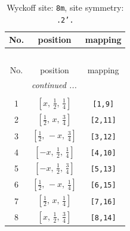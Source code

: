 \documentclass[fleqn,8pt]{jsarticle}
\begin{document}
\begin{longtable}{ccc}
\caption{Wyckoff site: {\tt 8m}, site symmetry: {\tt .2'.}}
 \\
 \hline \hline
No. & position & mapping \\ \hline \endfirsthead

\multicolumn{2}{l}{\tablename\ \thetable{}} \\
 \hline \hline
No. & position & mapping \\ \hline \endhead

 \hline \hline
\multicolumn{2}{r}{\footnotesize\it continued ...} \\ \endfoot

 \hline \hline
\multicolumn{2}{r}{} \\ \endlastfoot

1 & $\left[ x,\, \frac{1}{2},\, \frac{1}{4} \right]$ & {\tt [1,9]} \\ \hline
2 & $\left[ \frac{1}{2},\, x,\, \frac{3}{4} \right]$ & {\tt [2,11]} \\ \hline
3 & $\left[ \frac{1}{2},\, - x,\, \frac{3}{4} \right]$ & {\tt [3,12]} \\ \hline
4 & $\left[ - x,\, \frac{1}{2},\, \frac{1}{4} \right]$ & {\tt [4,10]} \\ \hline
5 & $\left[ - x,\, \frac{1}{2},\, \frac{3}{4} \right]$ & {\tt [5,13]} \\ \hline
6 & $\left[ \frac{1}{2},\, - x,\, \frac{1}{4} \right]$ & {\tt [6,15]} \\ \hline
7 & $\left[ \frac{1}{2},\, x,\, \frac{1}{4} \right]$ & {\tt [7,16]} \\ \hline
8 & $\left[ x,\, \frac{1}{2},\, \frac{3}{4} \right]$ & {\tt [8,14]} \\
\end{longtable}
\renewcommand{\arraystretch}{1.2}
\end{document}
